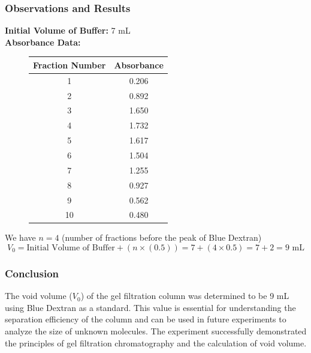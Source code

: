 \documentclass[openany]{book}
\begin{document}
\subsubsection{Observations and Results}
\textbf{Initial Volume of Buffer: } 7 mL \\
\textbf{Absorbance Data: } \\
\begin{figure}[H]
    \centering
    \begin{tabular}{|c|c|}
        \hline
        Fraction Number & Absorbance \\
        \hline
        1 & 0.206 \\
        2 & 0.892 \\
        3 & 1.650 \\
        4 & 1.732 \\
        5 & 1.617 \\
        6 & 1.504 \\
        7 & 1.255\\
        8 & 0.927 \\
        9 & 0.562 \\
        10 & 0.480 \\
        \hline
    \end{tabular}
\end{figure}
We have 
$n = 4$ (number of fractions before the peak of Blue Dextran) \\
$$V_0 = \text{Initial Volume of Buffer} + (n \times (0.5)) = \boxed{7 + (4 \times 0.5) = 7 + 2 = 9 \text{ mL}}$$
\subsubsection{Conclusion}
The void volume ($V_0$) of the gel filtration column was determined to be 9 mL using Blue Dextran as a standard. This value is essential for understanding the separation efficiency of the column and can be used in future experiments to analyze the size of unknown molecules. The experiment successfully demonstrated the principles of gel filtration chromatography and the calculation of void volume.
\end{document}

